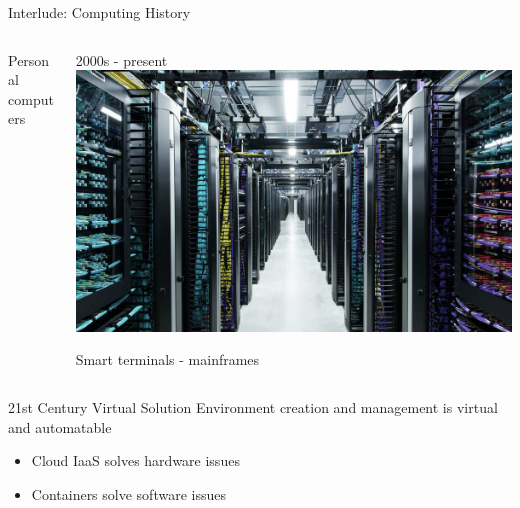 \documentclass{beamer}
\begin{document}
\begin{frame}{Interlude: Computing History}
\begin{columns}[T]
\begin{column}{.3\linewidth}
Personal computers
\end{column}

\begin{column}{.33\linewidth}
2000s - present
\includegraphics[width=\linewidth]{images/datacenter_fb}

Smart terminals - mainframes
\end{column}
\end{columns}
\end{frame}



\begin{frame}{21st Century Virtual Solution}
\alert{Environment creation and management is virtual and automatable}

\begin{itemize}
\item Cloud IaaS solves hardware issues
\item Containers solve software issues
\end{itemize}

\end{frame}
\end{document}
